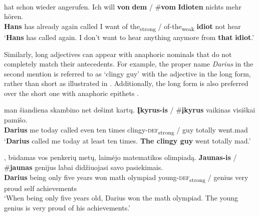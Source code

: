 \documentclass[output=paper,
modfonts
]{langscibook}
\begin{document}
\begin{exe}
	\ex \label{ex:sereikaite:40}
	 \citep[31]{Schwarz2009} \\
	 {hat} {schon} {wieder} {angerufen}. {Ich} {will} \textbf{von} \textbf{dem} \textnormal{/} \textnormal{\#}\textbf{vom} \textbf{Idioten} {nichts} {mehr} {hören}.\\
	\textbf{Hans} has already again called I want of {the\textsubscript{strong}} / \phantom{\#}of-the\textsubscript{weak} \textbf{idiot} not hear\\
	\trans `\textbf{Hans} has called again. I don’t want to hear anything anymore from \textbf{that} \textbf{idiot}.’  
\end{exe}


Similarly, long adjectives can appear with anaphoric nominals that do not completely match their antecedents. For example, the proper name \textit{Darius} in the second mention is referred to as `clingy guy' with the adjective in the long form, rather than short as illustrated in . Additionally, the long form is also preferred over the short one with anaphoric epithets .

\begin{exe}
	\ex \label{ex:sereikaite:41}
	 {man} {šiandiena} {skambino} {net} {dešimt} {kartų}. \textbf{Įkyrus-is} \textnormal{/} \textnormal{\#}\textbf{įkyrus} {vaikinas} {visiškai} {pamišo}. \\
	\textbf{Darius} me today called even ten times {clingy-\textsc{def}\textsubscript{strong}} /  guy totally went.mad\\
	\trans `\textbf{Darius} called me today at least ten times. \textbf{The clingy guy} went totally mad.' 
\end{exe}

\begin{exe}
	\ex \label{ex:sereikaite:42}
	, {būdamas} {vos} {penkerių} {metų}, {laimėjo} {matematikos} {olimpiadą}. \textbf{Jaunas-is} \textnormal{/} \textnormal{\#}\textbf{jaunas} {genijus} {labai} {didžiuojasi} {savo} {pasiekimais}.\\
	\textbf{Darius} being only five years won math olympiad {young-\textsc{def}\textsubscript{strong}} /  genius very proud self achievements\\
	\trans `When being only five years old, Darius won the math olympiad. The young genius is very proud of his achievements.' 
\end{exe}
\end{document}
